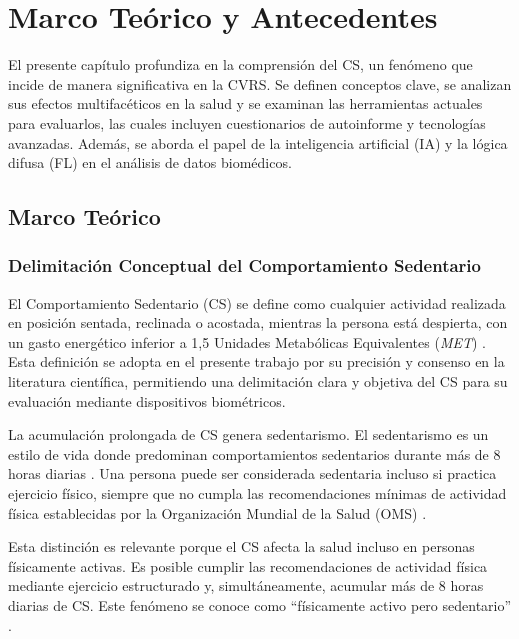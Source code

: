 ﻿\chapter{Marco Teórico y Antecedentes}
\label{chap:marco_teorico}

\noindent El presente capítulo profundiza en la comprensión del CS, un fenómeno que incide de manera significativa en la CVRS. Se definen conceptos clave, se analizan sus efectos multifacéticos en la salud y se examinan las herramientas actuales para evaluarlos, las cuales incluyen cuestionarios de autoinforme y tecnologías avanzadas. Además, se aborda el papel de la inteligencia artificial (IA) y la lógica difusa (FL) en el análisis de datos biomédicos.

\section{Marco Teórico}
\label{sec:marco_teorico}

\subsection{Delimitación Conceptual del Comportamiento Sedentario}
\label{subsec:definicion_cs_conceptos}

El Comportamiento Sedentario (CS) se define como cualquier actividad realizada en posición sentada, reclinada o acostada, mientras la persona está despierta, con un gasto energético inferior a 1,5 Unidades Metabólicas Equivalentes (\textit{MET}) \cite{Tremblay2017Terminology,Pate2008Evolving,Alvarez2020EnergyExpenditure}. Esta definición se adopta en el presente trabajo por su precisión y consenso en la literatura científica, permitiendo una delimitación clara y objetiva del CS para su evaluación mediante dispositivos biométricos.

La acumulación prolongada de CS genera sedentarismo. El sedentarismo es un estilo de vida donde predominan comportamientos sedentarios durante más de 8 horas diarias \cite{Tremblay2010Physiological}. Una persona puede ser considerada sedentaria incluso si practica ejercicio físico, siempre que no cumpla las recomendaciones mínimas de actividad física establecidas por la Organización Mundial de la Salud (OMS) \cite{WHO2020}.

Esta distinción es relevante porque el CS afecta la salud incluso en personas físicamente activas. Es posible cumplir las recomendaciones de actividad física mediante ejercicio estructurado y, simultáneamente, acumular más de 8 horas diarias de CS. Este fenómeno se conoce como ``físicamente activo pero sedentario'' \cite{Reyes2023Actividad}.

